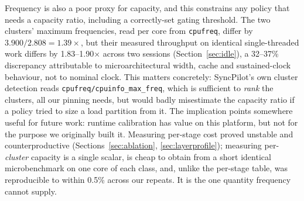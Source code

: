 \documentclass[conference]{IEEEtran}
\begin{document}
Frequency is also a poor proxy for capacity, and this constrains any policy that needs a capacity ratio, including a correctly-set gating threshold. The two clusters' maximum frequencies, read per core from \texttt{cpufreq}, differ by $3.900/2.808 = 1.39\times$, but their measured throughput on identical single-threaded work differs by 1.83--1.90$\times$ across two sessions (Section~\ref{sec:idle}), a 32--37\% discrepancy attributable to microarchitectural width, cache and sustained-clock behaviour, not to nominal clock. This matters concretely: SyncPilot's own cluster detection reads \texttt{cpufreq/cpuinfo\_max\_freq}, which is sufficient to \emph{rank} the clusters, all our pinning needs, but would badly misestimate the capacity ratio if a policy tried to size a load partition from it. The implication points somewhere useful for future work: runtime calibration has value on this platform, but not for the purpose we originally built it. Measuring per-stage cost proved unstable and counterproductive (Sections~\ref{sec:ablation}, \ref{sec:layerprofile}); measuring per-\emph{cluster} capacity is a single scalar, is cheap to obtain from a short identical microbenchmark on one core of each class, and, unlike the per-stage table, was reproducible to within 0.5\% across our repeats. It is the one quantity frequency cannot supply.
\end{document}
